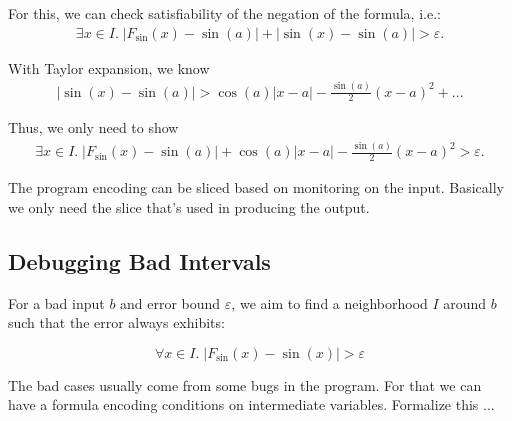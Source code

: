 For this, we can check satisfiability of the negation of the formula, i.e.:
\begin{eqnarray}
\exists x\in I.\; |F_{\sin}(x) - \sin(a)| + |\sin(x) - \sin(a)| > \varepsilon.
\end{eqnarray}

With Taylor expansion, we know
\begin{eqnarray}
|\sin(x) - \sin(a)| > \cos(a) |x - a| - \frac{\sin(a)}{2}(x-a)^2 + ... %
\end{eqnarray}

Thus, we only need to show
\begin{eqnarray}
\exists x\in I.\; |F_{\sin}(x) - \sin(a)| + \cos(a) |x - a| -
\frac{\sin(a)}{2}(x-a)^2 > \varepsilon.
\end{eqnarray}

The program encoding can be sliced based on monitoring on the input.
Basically we only need the slice that's used in producing the output.

\subsection{Debugging Bad Intervals}

For a bad input $b$ and error bound $\varepsilon$, we aim to find a
neighborhood $I$ around $b$ such that the error always exhibits:

$$ \forall x\in I.\; |F_{\sin}(x) - \sin(x)| > \varepsilon$$

The bad cases usually come from some bugs in the program. For that we
can have a formula encoding conditions on intermediate variables.
Formalize this ...

